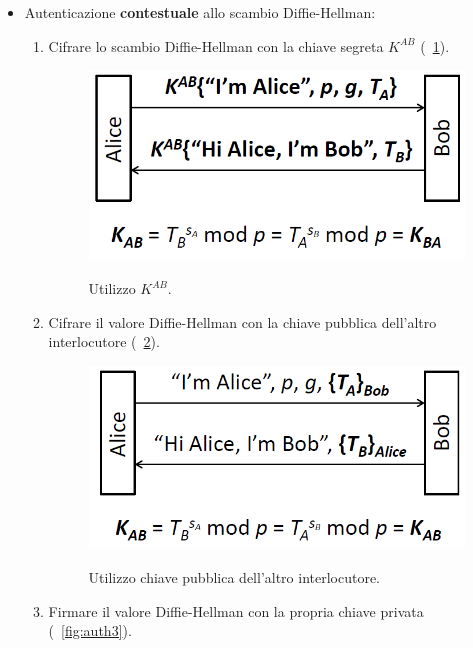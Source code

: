 \begin{itemize}
\item Autenticazione \textbf{contestuale} allo scambio Diffie-Hellman: \begin{enumerate}
\item Cifrare lo scambio Diffie-Hellman con la chiave segreta $K^{AB}$ (\figurename~\ref{fig:auth1}).
\begin{figure}[htbp]
	\centering%
	\subfigure%
	{\includegraphics[scale=0.5, keepaspectratio]{Immagini/chiave_pubblica/DiffieHellman_auth1.png}}
	\caption{Utilizzo $K^{AB}$.}
	\label{fig:auth1}
	\end{figure}
\item Cifrare il valore Diffie-Hellman con la chiave pubblica dell'altro interlocutore (\figurename~\ref{fig:auth2}).
\begin{figure}[htbp]
	\centering%
	\subfigure%
	{\includegraphics[scale=0.5, keepaspectratio]{Immagini/chiave_pubblica/DiffieHellman_auth2.png}}
	\caption{Utilizzo chiave pubblica dell'altro interlocutore.}
	\label{fig:auth2}
	\end{figure}
\item Firmare il valore Diffie-Hellman con la propria chiave privata (\figurename~\ref{fig:auth3}).
\begin{figure}[htbp]

\end{figure}
\end{enumerate}
\end{itemize}
